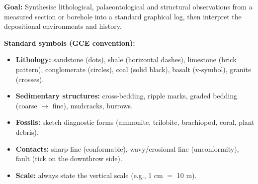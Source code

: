 \documentclass[11pt]{article}
\begin{document}
\begin{methode}
\textbf{Goal:} Synthesise lithological, palaeontological and structural observations from a measured section or borehole into a standard graphical log, then interpret the depositional environments and history.

\textbf{Standard symbols (GCE convention):}
\begin{itemize}
    \item \textbf{Lithology:} sandstone (dots), shale (horizontal dashes), limestone (brick pattern), conglomerate (circles), coal (solid black), basalt (v-symbol), granite (crosses).
    \item \textbf{Sedimentary structures:} cross-bedding, ripple marks, graded bedding (coarse $\rightarrow$ fine), mudcracks, burrows.
    \item \textbf{Fossils:} sketch diagnostic forms (ammonite, trilobite, brachiopod, coral, plant debris).
    \item \textbf{Contacts:} sharp line (conformable), wavy/erosional line (unconformity), fault (tick on the downthrow side).
    \item \textbf{Scale:} always state the vertical scale (e.g., 1 cm $=$ 10 m).
\end{itemize}


\end{methode}
\end{document}

